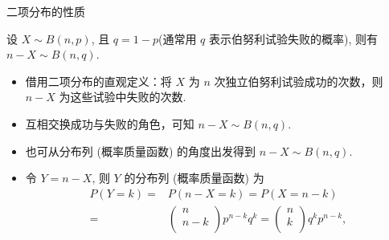 \documentclass[Prob-All.tex]{subfiles}
\begin{document}
\begin{frame}{二项分布的性质}
	\begin{thm}\label{338} 设 $X\sim B (n,p)$, 且 $q=1-p$(通常用 $q$ 表示伯努利试验失败的概率), 则有 $n-X\sim B (n,q)$.
	\end{thm}

	\pause
	\begin{itemize}[<+-|alert@+>]
		\item 借用二项分布的直观定义：将 $X$ 为 $n$ 次独立伯努利试验成功的次数，则 $n-X$ 为这些试验中失败的次数.
		\item 互相交换成功与失败的角色，可知 $n-X\sim B (n,q)$.
		\item 也可从分布列 (概率质量函数) 的角度出发得到
		      $n-X\sim B(n,q).$
		\item 令 $Y=n-X$, 则 $Y$ 的分布列 (概率质量函数) 为 \pause
		      \begin{equation*}
			      \begin{aligned}
				      P(Y=k)= & P(n-X=k)=P(X=n-k)                                                           \\
				      =       & \left(\begin{matrix}
						                      n   \\
						                      n-k \\
					                      \end{matrix}\right)p^{n-k}q^{k}=\left(\begin{matrix}
						                                                            n \\
						                                                            k \\
					                                                            \end{matrix}\right)q^kp^{n-k},
			      \end{aligned}
		      \end{equation*}
	\end{itemize}
\end{frame}
\end{document}
